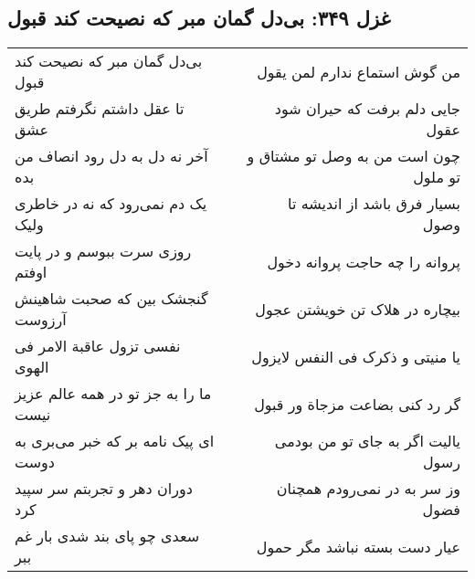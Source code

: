 \begin{center}
\section*{غزل ۳۴۹: بی‌دل گمان مبر که نصیحت کند قبول}
\label{sec:349}
\begin{longtable}{l p{0.5cm} r}
بی‌دل گمان مبر که نصیحت کند قبول
&&
من گوش استماع ندارم لمن یقول
\\
تا عقل داشتم نگرفتم طریق عشق
&&
جایی دلم برفت که حیران شود عقول
\\
آخر نه دل به دل رود انصاف من بده
&&
چون است من به وصل تو مشتاق و تو ملول
\\
یک دم نمی‌رود که نه در خاطری ولیک
&&
بسیار فرق باشد از اندیشه تا وصول
\\
روزی سرت ببوسم و در پایت اوفتم
&&
پروانه را چه حاجت پروانه دخول
\\
گنجشک بین که صحبت شاهینش آرزوست
&&
بیچاره در هلاک تن خویشتن عجول
\\
نفسی تزول عاقبة الامر فی الهوی
&&
یا منیتی و ذکرک فی النفس لایزول
\\
ما را به جز تو در همه عالم عزیز نیست
&&
گر رد کنی بضاعت مزجاة ور قبول
\\
ای پیک نامه بر که خبر می‌بری به دوست
&&
یالیت اگر به جای تو من بودمی رسول
\\
دوران دهر و تجربتم سر سپید کرد
&&
وز سر به در نمی‌رودم همچنان فضول
\\
سعدی چو پای بند شدی بار غم ببر
&&
عیار دست بسته نباشد مگر حمول
\\
\end{longtable}
\end{center}

